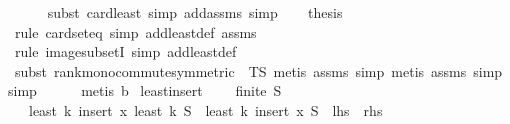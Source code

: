 \begin{isabellebody}
\ \ \ \ \isamarkupfalse%
\ {\isacharparenleft}{\kern0pt}subst\ card{\isacharunderscore}{\kern0pt}least{\isacharcomma}{\kern0pt}\ simp\ add{\isacharcolon}{\kern0pt}assms{\isacharcomma}{\kern0pt}\ simp{\isacharparenright}{\kern0pt}\isanewline
\isanewline
\ \ \isamarkupfalse%
\ {\isacharquery}{\kern0pt}thesis\isanewline
\ \ \ \ \isamarkupfalse%
\ {\isacharparenleft}{\kern0pt}rule\ card{\isacharunderscore}{\kern0pt}seteq{\isacharcomma}{\kern0pt}\ simp\ add{\isacharcolon}{\kern0pt}least{\isacharunderscore}{\kern0pt}def\ assms{\isacharparenright}{\kern0pt}\isanewline
\ \ \ \ \ \isamarkupfalse%
\ {\isacharparenleft}{\kern0pt}rule\ image{\isacharunderscore}{\kern0pt}subsetI{\isacharcomma}{\kern0pt}\ simp\ add{\isacharcolon}{\kern0pt}least{\isacharunderscore}{\kern0pt}def{\isacharparenright}{\kern0pt}\isanewline
\ \ \ \ \ \isamarkupfalse%
\ {\isacharparenleft}{\kern0pt}subst\ rank{\isacharunderscore}{\kern0pt}mono{\isacharunderscore}{\kern0pt}commute{\isacharbrackleft}{\kern0pt}symmetric{\isacharcomma}{\kern0pt}\ \ T{\isacharequal}{\kern0pt}{\isachardoublequoteopen}S{\isachardoublequoteclose}{\isacharbrackright}{\kern0pt}{\isacharcomma}{\kern0pt}\ metis\ assms{\isacharparenleft}{\kern0pt}{}{\isacharparenright}{\kern0pt}{\isacharcomma}{\kern0pt}\ simp{\isacharcomma}{\kern0pt}\ metis\ assms{\isacharparenleft}{\kern0pt}{}{\isacharparenright}{\kern0pt}{\isacharcomma}{\kern0pt}\ simp{\isacharcomma}{\kern0pt}\ simp{\isacharparenright}{\kern0pt}\isanewline
\ \ \ \ \isamarkupfalse%
\ {\isacharparenleft}{\kern0pt}metis\ b{\isacharparenright}{\kern0pt}\isanewline
{}\isamarkupfalse%
%
\endisatagproof
{\isafoldproof}%
%
\isadelimproof
\isanewline
%
\endisadelimproof
\isanewline
{}\isamarkupfalse%
\ least{\isacharunderscore}{\kern0pt}insert{\isacharcolon}{\kern0pt}\ \isanewline
\ \ \ {\isachardoublequoteopen}finite\ S{\isachardoublequoteclose}\isanewline
\ \ \ {\isachardoublequoteopen}least\ k\ {\isacharparenleft}{\kern0pt}insert\ x\ {\isacharparenleft}{\kern0pt}least\ k\ S{\isacharparenright}{\kern0pt}{\isacharparenright}{\kern0pt}\ {\isacharequal}{\kern0pt}\ least\ k\ {\isacharparenleft}{\kern0pt}insert\ x\ S{\isacharparenright}{\kern0pt}{\isachardoublequoteclose}\ {\isacharparenleft}{\kern0pt}\ {\isachardoublequoteopen}{\isacharquery}{\kern0pt}lhs\ {\isacharequal}{\kern0pt}\ {\isacharquery}{\kern0pt}rhs{\isachardoublequoteclose}{\isacharparenright}{\kern0pt}\isanewline

\end{isabellebody}
